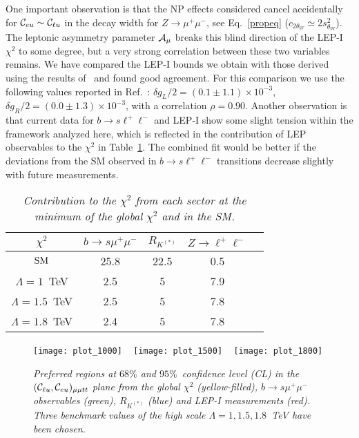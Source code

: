 \documentclass[aps,twocolumn,showpacs,preprintnumbers,amsmath,amssymb,floatfix,nofootinbib]{revtex4-1}
\newcommand{\C}{{\cal C}}
\begin{document}
One important observation is that the NP effects considered cancel accidentally for $\C_{eu} \sim \C_{\ell u}$ in the decay width for $Z \to \mu^+ \mu^-$, see Eq.~\eqref{propeq} ($c_{2 \theta_W} \simeq 2 s_{\theta_W}^2$). The leptonic asymmetry parameter ${\cal{A}}_{\mu}$ breaks this blind direction of the LEP-I $\chi^2$ to some degree, but a very strong correlation between these two variables remains.       We have compared the LEP-I  bounds we obtain with those derived using the results of~\cite{Efrati:2015eaa} and found good agreement.   For this comparison we use the following values reported in Ref.~\cite{Efrati:2015eaa}: $\delta g_L/2 = (0.1 \pm 1.1) \times10^{-3}$, $\delta g_R/2 = (0.0 \pm 1.3) \times10^{-3}$, with a correlation $\rho= 0.90$.    Another observation is that current data for $b \to s \ell^+ \ell^-$ and LEP-I show some slight tension within the framework analyzed here, which is reflected in the contribution of LEP observables to the $\chi^2$ in Table~\ref{tab:chi2}. The combined fit would be better if the deviations from the SM observed in $b \to s \ell^+ \ell^-$ transitions decrease slightly with future measurements.  




\begin{table}[ht]
\caption{\textit{Contribution to the $\chi^2$ from each sector at the minimum of the global $\chi^2$ and in the SM. } \label{tab:chi2}  }
\begin{center}
\begin{tabular}{|c|c|c|c|c|}
    $\chi^2$  &     $b \to s \mu^+ \mu^-$  &  $R_{K^{(*)}}$   &   $Z \to \ell^+ \ell^-$  \\    \hline   
   ${\rm{SM}}$  &      25.8   &     22.5    &   0.5           \\ 
   $\Lambda = 1$~TeV  &     2.5 &   5  &   7.9  \\
      $\Lambda = 1.5$~TeV  &    2.5       &    5  &    7.8  \\
               $\Lambda = 1.8$~TeV  &   2.4             &    5    &    7.8  \\
\end{tabular}
\end{center}
\end{table}%





\begin{figure}[htp]
\begin{center}{
\texttt{[image: plot\_1000]}
~
\texttt{[image: plot\_1500]}
~
\texttt{[image: plot\_1800]}
\caption{\textit{Preferred regions at $68\%$ and $95\%$~confidence level (CL) in the $(\C_{\ell u}, \C_{eu})_{\mu \mu tt}$ plane from the global $\chi^2$ (yellow-filled), $b \to s \mu^+ \mu^-$ observables (green), $R_{K^{(*)}}$ (blue) and LEP-I measurements (red).   Three benchmark values of the high scale $\Lambda= 1,1.5,1.8$~TeV have been chosen.}  \label{figplots} } }
\end{center}
\end{figure}
\end{document}
